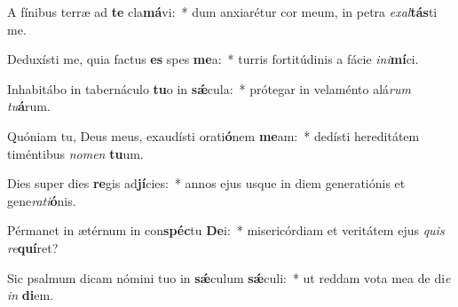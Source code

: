 \item A fínibus terræ ad \textbf{te} cla\textbf{má}vi:~* dum anxiarétur cor meum, in petra \textit{ex}\textit{al}\textbf{tás}ti me.
\item Deduxísti me, quia factus \textbf{es} spes \textbf{me}a:~* turris fortitúdinis a fácie \textit{in}\textit{i}\textbf{mí}ci.
\item Inhabitábo in tabernáculo \textbf{tu}o in \textbf{sǽ}cula:~* prótegar in velaménto alá\textit{rum} \textit{tu}\textbf{á}rum.
\item Quóniam tu, Deus meus, exaudísti orati\textbf{ó}nem \textbf{me}am:~* dedísti hereditátem timéntibus \textit{no}\textit{men} \textbf{tu}um.
\item Dies super dies \textbf{re}gis ad\textbf{jí}cies:~* annos ejus usque in diem generatiónis et gene\textit{ra}\textit{ti}\textbf{ó}nis.
\item Pérmanet in ætérnum in con\textbf{spéc}tu \textbf{De}i:~* misericórdiam et veritátem ejus \textit{quis} \textit{re}\textbf{quí}ret?
\item Sic psalmum dicam nómini tuo in \textbf{sǽ}culum \textbf{sǽ}culi:~* ut reddam vota mea de di\textit{e} \textit{in} \textbf{di}em.
